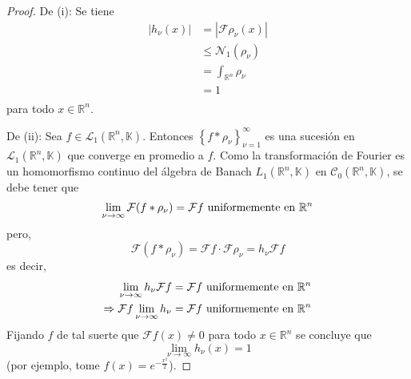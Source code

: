 \documentclass[12pt]{report}
\newcounter{it}
\theoremstyle{largebreak}
\renewcommand{\leq}{\ensuremath{\leqslant}}
\newcommand\abs[1]{\ensuremath{\left|#1\right|}}
\newcommand{\N}[2]{\ensuremath{\mathcal{N}_{#1}\left(#2\right)}}
\newcommand{\fou}[1]{\ensuremath{\mathcal{F}#1}}
\begin{document}
    \begin{proof}
        De (i): Se tiene
        \begin{equation*}
            \begin{split}
                \abs{h_\nu(x)}&=\abs{\fou{\rho_\nu}(x)}\\
                &\leq\N{1}{\rho_\nu}\\
                &=\int_{\mathbb{R}^n}\rho_\nu\\
                &=1\\
            \end{split}
        \end{equation*}
        para todo $x\in\mathbb{R}^n$.

        De (ii): Sea $f\in\mathcal{L}_1(\mathbb{R}^n,\mathbb{K})$. Entonces $\left\{f*\rho_\nu \right\}_{ \nu=1}^\infty$ es una sucesión en $\mathcal{L}_1(\mathbb{R}^n,\mathbb{K})$ que converge en promedio a $f$. Como la transformación de Fourier es un homomorfismo continuo del álgebra de Banach $L_1(\mathbb{R}^n,\mathbb{K})$ en $\mathcal{C}_0(\mathbb{R}^n,\mathbb{K})$, se debe tener que
        \begin{equation*}
            \lim_{\nu\rightarrow\infty}\fou{(f*\rho_\nu)}=\fou{f}\textup{ uniformemente en }\mathbb{R}^n
        \end{equation*}
        pero,
        \begin{equation*}
            \fou{(f*\rho_\nu)}=\fou{f}\cdot\fou{\rho_\nu}=h_\nu\fou{f}
        \end{equation*}
        es decir,
        \begin{equation*}
            \begin{split}
                \lim_{\nu\rightarrow\infty}h_\nu\fou{f}&=\fou{f}\textup{ uniformemente en }\mathbb{R}^n\\
                \Rightarrow \fou{f}\lim_{\nu\rightarrow\infty}h_\nu&=\fou{f}\textup{ uniformemente en }\mathbb{R}^n\\
            \end{split}
        \end{equation*}
        Fijando $f$ de tal suerte que $\fou{f}(x)\neq0$ para todo $x\in\mathbb{R}^n$ se concluye que
        \begin{equation*}
            \lim_{\nu\rightarrow\infty}h_\nu(x)=1
        \end{equation*}
        (por ejemplo, tome $f(x)=e^{-\frac{x^2}{2}}$).
    \end{proof}
\end{document}
